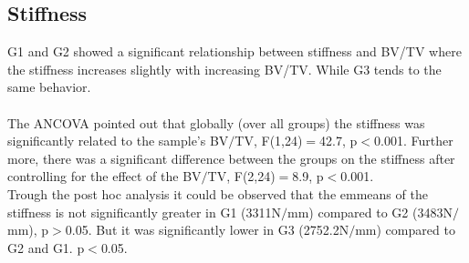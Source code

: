 \documentclass[12pt, a4paper, twoside]{report}
\begin{document}
\subsection{Stiffness}
%
\begin{figure}[H]
\centering 
{}
\label{fig:sigma_exp}
\end{figure}
%
\begin{table}[H]
\centering
{}
\caption{Results for the linear regression (RSE: residual standard error, CV: coefficient of variation) of the experimentally evaluated stiffness values. And the evaluation of the ANCOVA by the emmenas after Bonferroni correction.}
\label{tab:LGsigma}
\end{table}
%
G1 and G2 showed a significant relationship between stiffness and BV/TV where the stiffness increases slightly with increasing BV/TV. While G3 tends to the same behavior.\\
\\
The ANCOVA pointed out that globally (over all groups) the stiffness was significantly related to the sample's BV$/$TV, F(1,24)$=$42.7, p$<$0.001. Further more, there was a significant difference between the groups on the stiffness after controlling for the effect of the BV$/$TV, F(2,24)$=$8.9, p$<$0.001.\\
Trough the post hoc analysis it could be observed that the emmeans of the stiffness is not significantly greater in G1 (3311N$/$mm) compared to G2 (3483N$/$mm), p$>$0.05. But it was significantly lower in G3 (2752.2N$/$mm) compared to G2 and G1. p$<$0.05.
%
%
%
\end{document}
